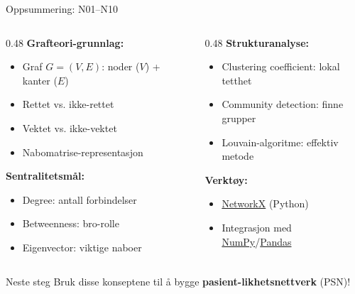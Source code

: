 \documentclass[aspectratio=169, 10pt]{beamer}
\begin{document}
\begin{frame}{Oppsummering: N01--N10}
    
    \begin{columns}
        \begin{column}{0.48\textwidth}
            \textbf{Grafteori-grunnlag:}
            \begin{itemize}
                \item Graf $G = (V, E)$: noder ($V$) + kanter ($E$)
                \item Rettet vs. ikke-rettet
                \item Vektet vs. ikke-vektet
                \item Nabomatrise-representasjon
            \end{itemize}
            
            \vspace{3mm}
            
            \textbf{Sentralitetsmål:}
            \begin{itemize}
                \item Degree: antall forbindelser
                \item Betweenness: bro-rolle
                \item Eigenvector: viktige naboer
            \end{itemize}
        \end{column}
        
        \begin{column}{0.48\textwidth}
            \textbf{Strukturanalyse:}
            \begin{itemize}
                \item Clustering coefficient: lokal tetthet
                \item Community detection: finne grupper
                \item Louvain-algoritme: effektiv metode
            \end{itemize}
            
            \vspace{3mm}
            
            \textbf{Verktøy:}
            \begin{itemize}
                \item \href{https://networkx.org/}{NetworkX} (Python)
                \item Integrasjon med \href{https://numpy.org/}{NumPy}/\href{https://pandas.pydata.org/}{Pandas}
            \end{itemize}
        \end{column}
    \end{columns}
    
    \vspace{5mm}
    
    \begin{block}{Neste steg}
        Bruk disse konseptene til å bygge \textbf{pasient-likhetsnettverk} (PSN)!
    \end{block}
    
\end{frame}
\end{document}
